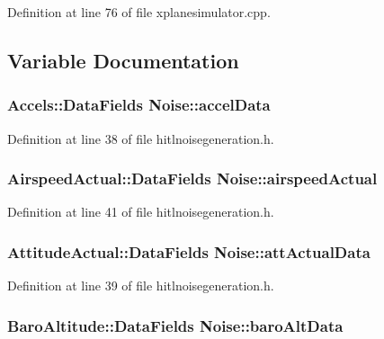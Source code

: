Definition at line 76 of file xplanesimulator.\-cpp.



\subsection{Variable Documentation}
\hypertarget{group__hitlplugin_ga20a9e1e87d0a44b532c7e8c44555bdde}{
\subsubsection[{accel\-Data}]{\setlength{\rightskip}{0pt plus 5cm}Accels\-::\-Data\-Fields Noise\-::accel\-Data}}\label{group__hitlplugin_ga20a9e1e87d0a44b532c7e8c44555bdde}


Definition at line 38 of file hitlnoisegeneration.\-h.

\hypertarget{group__hitlplugin_ga6481423a6f6cc57475e660281ba3d77d}{
\subsubsection[{airspeed\-Actual}]{\setlength{\rightskip}{0pt plus 5cm}Airspeed\-Actual\-::\-Data\-Fields Noise\-::airspeed\-Actual}}\label{group__hitlplugin_ga6481423a6f6cc57475e660281ba3d77d}


Definition at line 41 of file hitlnoisegeneration.\-h.

\hypertarget{group__hitlplugin_ga689a709ae944673ff6edd54ab6ca4d7d}{
\subsubsection[{att\-Actual\-Data}]{\setlength{\rightskip}{0pt plus 5cm}Attitude\-Actual\-::\-Data\-Fields Noise\-::att\-Actual\-Data}}\label{group__hitlplugin_ga689a709ae944673ff6edd54ab6ca4d7d}


Definition at line 39 of file hitlnoisegeneration.\-h.

\hypertarget{group__hitlplugin_gab586e8f2c72c1e42c715debf0bd202b1}{
\subsubsection[{baro\-Alt\-Data}]{\setlength{\rightskip}{0pt plus 5cm}Baro\-Altitude\-::\-Data\-Fields Noise\-::baro\-Alt\-Data}}\label{group__hitlplugin_gab586e8f2c72c1e42c715debf0bd202b1}


